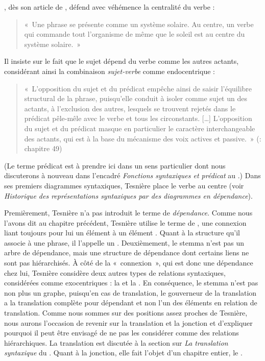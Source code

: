 {    , dès son article de \citeyear{tesniere1934comment}, défend avec véhémence la centralité du verbe : 
    \begin{quote}«~Une phrase se présente comme un système solaire. Au centre, un verbe qui commande tout l’organisme de même que le soleil est au centre du système solaire.~»\end{quote}
    Il insiste sur le fait que le sujet dépend du verbe comme les autres actants, considérant ainsi la combinaison \textit{sujet-verbe} comme endocentrique : 
    \begin{quote}«~L’opposition du sujet et du prédicat empêche ainsi de saisir l’équilibre structural de la phrase, puisqu’elle conduit à isoler comme sujet un des actants, à l’exclusion des autres, lesquels se trouvent rejetés dans le prédicat pêle-mêle avec le verbe et tous les circonstants. […] L’opposition du sujet et du prédicat masque en particulier le caractère interchangeable des actants, qui est à la base du mécanisme des voix actives et passive.~» (\citeyear{tesniere1959elements}: chapitre 49)\end{quote}
    (Le terme prédicat est à prendre ici dans un sens particulier dont nous discuterons à nouveau dans l’encadré \textit{Fonctions syntaxiques et prédicat} au .) Dans ses premiers diagrammes syntaxiques, Tesnière place le verbe au centre (voir  \textit{Historique des représentations syntaxiques par des diagrammes en dépendance}).

    Premièrement, Tesnière n’a pas introduit le terme de \textit{dépendance}. Comme nous l’avons dit au chapitre précédent, Tesnière utilise le terme de {}, une connexion liant toujours pour lui un élément  à un élément . Quant à la structure qu’il associe à une phrase, il l’appelle un . Deuxièmement, le stemma n’est pas un arbre de dépendance, mais une structure de dépendance dont certains liens ne sont pas hiérarchisés. À côté de la «~connexion~», qui est donc une dépendance chez lui, Tesnière considère deux autres types de relations syntaxiques, considérées comme exocentriques : la  et la . En conséquence, le stemma n’est pas non plus un graphe, puisqu’en cas de translation, le gouverneur de la translation a la translation complète pour dépendant et non l’un des éléments en relation de translation. Comme nous sommes sur des positions assez proches de Tesnière, nous aurons l’occasion de revenir sur la translation et la jonction et d’expliquer pourquoi il peut être envisagé de ne pas les considérer comme des relations hiérarchiques. La translation est discutée à la section sur \textit{La translation syntaxique} du . Quant à la jonction, elle fait l’objet d’un chapitre entier, le .

}
